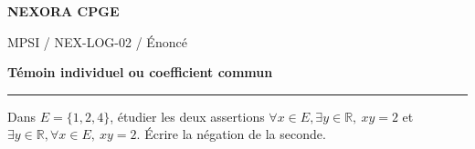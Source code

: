 \documentclass[11pt,a4paper]{article}
\begin{document}
{\small\bfseries\color{nexorablue} NEXORA CPGE}\par
{\small MPSI / NEX-LOG-02 / Énoncé}\par
{\LARGE\bfseries Témoin individuel ou coefficient commun}\par
\vspace{0.25em}\hrule\vspace{0.6em}

Dans $E=\{1,2,4\}$, étudier les deux assertions $\forall x\in E,\exists y\in\mathbb R,\ xy=2$ et $\exists y\in\mathbb R,\forall x\in E,\ xy=2$. Écrire la négation de la seconde.
\end{document}
